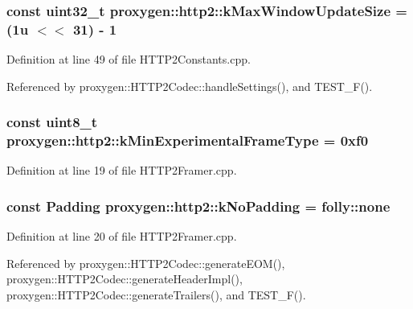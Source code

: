 \subsubsection[{k\+Max\+Window\+Update\+Size}]{\setlength{\rightskip}{0pt plus 5cm}const uint32\+\_\+t proxygen\+::http2\+::k\+Max\+Window\+Update\+Size = (1u $<$$<$ 31) -\/ 1}\label{namespaceproxygen_1_1http2_ac959007c9791443acd020c9a562c1bfe}


Definition at line 49 of file H\+T\+T\+P2\+Constants.\+cpp.



Referenced by proxygen\+::\+H\+T\+T\+P2\+Codec\+::handle\+Settings(), and T\+E\+S\+T\+\_\+\+F().

\subsubsection[{k\+Min\+Experimental\+Frame\+Type}]{\setlength{\rightskip}{0pt plus 5cm}const uint8\+\_\+t proxygen\+::http2\+::k\+Min\+Experimental\+Frame\+Type = 0xf0}\label{namespaceproxygen_1_1http2_ae4e37fbdf8dc1f8e39e40803d4fbb38e}


Definition at line 19 of file H\+T\+T\+P2\+Framer.\+cpp.

\subsubsection[{k\+No\+Padding}]{\setlength{\rightskip}{0pt plus 5cm}const {\bf Padding} proxygen\+::http2\+::k\+No\+Padding = folly\+::none}\label{namespaceproxygen_1_1http2_a235817c784b0c7d4cf29d577d8203ca5}


Definition at line 20 of file H\+T\+T\+P2\+Framer.\+cpp.



Referenced by proxygen\+::\+H\+T\+T\+P2\+Codec\+::generate\+E\+O\+M(), proxygen\+::\+H\+T\+T\+P2\+Codec\+::generate\+Header\+Impl(), proxygen\+::\+H\+T\+T\+P2\+Codec\+::generate\+Trailers(), and T\+E\+S\+T\+\_\+\+F().

